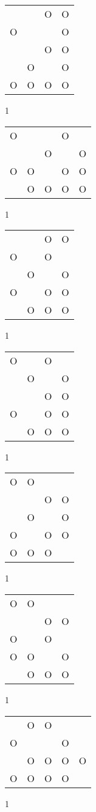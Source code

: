 \begin{tabular}{|m{0.2cm}m{0.2cm}m{0.2cm}m{0.2cm}|}\hline
 & &O&O\\
O& & &O\\
 & &O&O\\
 &O& &O\\
O&O&O&O\\
\hline\end{tabular}1
\begin{tabular}{|m{0.2cm}m{0.2cm}m{0.2cm}m{0.2cm}m{0.2cm}|}\hline
O& & &O& \\
 & &O& &O\\
O&O& &O&O\\
 &O&O&O&O\\
\hline\end{tabular}1
\begin{tabular}{|m{0.2cm}m{0.2cm}m{0.2cm}m{0.2cm}|}\hline
 & &O&O\\
O& &O& \\
 &O& &O\\
O& &O&O\\
 &O&O&O\\
\hline\end{tabular}1
\begin{tabular}{|m{0.2cm}m{0.2cm}m{0.2cm}m{0.2cm}|}\hline
O& &O& \\
 &O& &O\\
 & &O&O\\
O& &O&O\\
 &O&O&O\\
\hline\end{tabular}1
\begin{tabular}{|m{0.2cm}m{0.2cm}m{0.2cm}m{0.2cm}|}\hline
O&O& & \\
 & &O&O\\
 &O& &O\\
O& &O&O\\
O&O&O& \\
\hline\end{tabular}1
\begin{tabular}{|m{0.2cm}m{0.2cm}m{0.2cm}m{0.2cm}|}\hline
O&O& & \\
 & &O&O\\
O& &O& \\
O&O& &O\\
 &O&O&O\\
\hline\end{tabular}1
\begin{tabular}{|m{0.2cm}m{0.2cm}m{0.2cm}m{0.2cm}m{0.2cm}|}\hline
 &O&O& & \\
O& & &O& \\
 &O&O&O&O\\
O&O&O&O& \\
\hline\end{tabular}1
